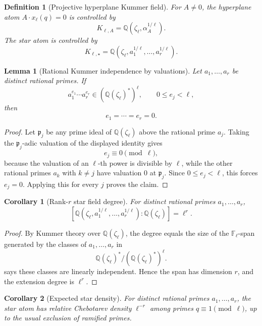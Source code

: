 \documentclass[11pt]{article}
\newtheorem{lemma}{Lemma}
\newtheorem{corollary}{Corollary}
\newtheorem{definition}{Definition}
\newcommand{\Q}{\mathbb Q}
\newcommand{\F}{\mathbb F}
\begin{document}
\begin{definition}[Projective hyperplane Kummer field]\label{D:hyperfield}
For \(A\ne0\), the hyperplane atom \(A\cdot x_\ell(q)=0\) is controlled by
\[
K_{\ell,A}=\Q(\zeta_\ell,\alpha_A^{1/\ell}).
\]
The star atom is controlled by
\[
K_{\ell,\star}=\Q(\zeta_\ell,a_1^{1/\ell},\ldots,a_r^{1/\ell}).
\]
\end{definition}

\begin{lemma}[Rational Kummer independence by valuations]\label{L:kummer-independence}
Let \(a_1,\ldots,a_r\) be distinct rational primes.  If
\[
a_1^{e_1}\cdots a_r^{e_r}\in(\Q(\zeta_\ell)^*)^\ell,
\qquad
0\le e_j<\ell,
\]
then
\[
e_1=\cdots=e_r=0.
\]
\end{lemma}

\begin{proof}
Let \(\mathfrak p_j\) be any prime ideal of \(\Q(\zeta_\ell)\) above the rational prime \(a_j\).  Taking the \(\mathfrak p_j\)-adic valuation of the displayed identity gives
\[
e_j\equiv0\pmod\ell,
\]
because the valuation of an \(\ell\)-th power is divisible by \(\ell\), while the other rational primes \(a_k\) with \(k\ne j\) have valuation \(0\) at \(\mathfrak p_j\).  Since \(0\le e_j<\ell\), this forces \(e_j=0\).  Applying this for every \(j\) proves the claim.
\end{proof}

\begin{corollary}[Rank-\(r\) star field degree]\label{C:star-degree}
For distinct rational primes \(a_1,\ldots,a_r\),
\[
[\Q(\zeta_\ell,a_1^{1/\ell},\ldots,a_r^{1/\ell}):\Q(\zeta_\ell)]
=
\ell^r.
\]
\end{corollary}

\begin{proof}
By Kummer theory over \(\Q(\zeta_\ell)\), the degree equals the size of the \(\F_\ell\)-span generated by the classes of \(a_1,\ldots,a_r\) in
\[
\Q(\zeta_\ell)^*/(\Q(\zeta_\ell)^*)^\ell.
\]
 says these classes are linearly independent.  Hence the span has dimension \(r\), and the extension degree is \(\ell^r\).
\end{proof}

\begin{corollary}[Expected star density]\label{C:star-density}
For distinct rational primes \(a_1,\ldots,a_r\), the star atom has relative Chebotarev density \(\ell^{-r}\) among primes \(q\equiv1\pmod\ell\), up to the usual exclusion of ramified primes.
\end{corollary}
\end{document}

